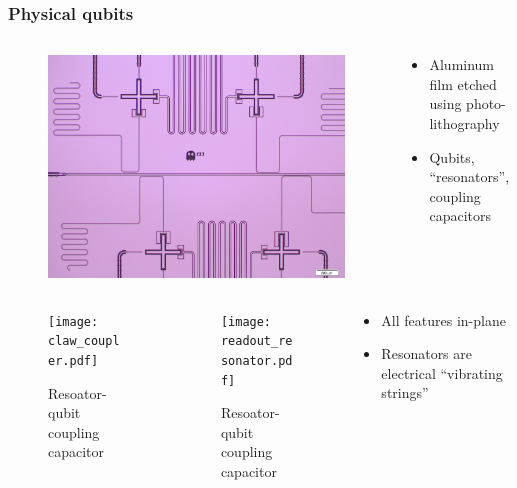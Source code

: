 \begin{frame}
\frametitle{Physical qubits}
\begin{columns}
  \begin{column}{0.4\textwidth}
    \begin{figure}
      \includegraphics[scale=0.045]{physical_qubit.jpg}
    \end{figure}
  \end{column}
  \begin{column}{0.6\textwidth}
    \begin{itemize}
      \item Aluminum film etched using photo-lithography
      \item Qubits, ``resonators'', coupling capacitors
    \end{itemize}
  \end{column}
\end{columns}
\begin{columns}
  \begin{column}{0.25\textwidth}
    \begin{figure}
      \texttt{[image: claw\_coupler.pdf]}
      \caption*{Resoator-qubit coupling capacitor}
    \end{figure}
  \end{column}
  \begin{column}{0.25\textwidth}
    \begin{figure}
      \texttt{[image: readout\_resonator.pdf]}
      \caption*{Resoator-qubit coupling capacitor}
    \end{figure}
  \end{column}
  \begin{column}{0.5\textwidth}
    \begin{itemize}
      \item All features in-plane
      \item Resonators are electrical ``vibrating strings''
    \end{itemize}
  \end{column}
\end{columns}
\end{frame}
